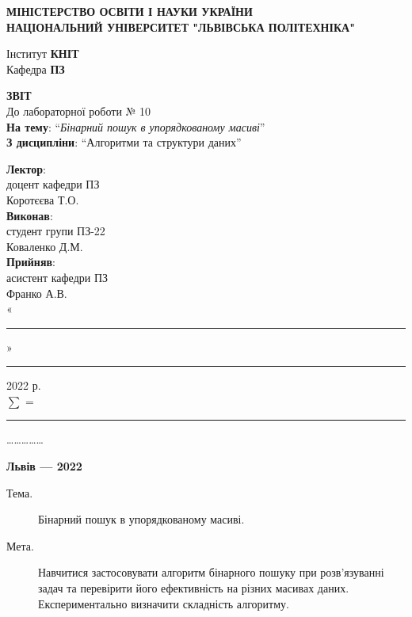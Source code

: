 \documentclass{article}
\newcommand\subject{Алгоритми та структури даних}
\newcommand\lecturer{доцент кафедри ПЗ\\Коротєєва Т.О.}
\newcommand\teacher{асистент кафедри ПЗ\\Франко А.В.}
\newcommand\mygroup{ПЗ-22}
\newcommand\lab{10}
\newcommand\theme{Бінарний пошук в упорядкованому масиві}
\newcommand\purpose{Навчитися застосовувати алгоритм бінарного пошуку при розв’язуванні задач та перевірити його ефективність на різних масивах даних. Експериментально визначити складність алгоритму}
\begin{document}
	\begin{normalsize}
		\begin{titlepage}
			\thispagestyle{empty}
			\begin{center}
				\textbf{МІНІСТЕРСТВО ОСВІТИ І НАУКИ УКРАЇНИ\\
					НАЦІОНАЛЬНИЙ УНІВЕРСИТЕТ "ЛЬВІВСЬКА ПОЛІТЕХНІКА"}
			\end{center}
			\begin{flushright}
				Інститут \textbf{КНІТ}\\
				Кафедра \textbf{ПЗ}
			\end{flushright}
			\vspace{200pt}
			\begin{center}
				\textbf{ЗВІТ}\\
				\vspace{10pt}
				До лабораторної роботи № \lab\\
				\textbf{На тему}: “\textit{\theme}”\\
				\textbf{З дисципліни}: “\subject”
			\end{center}
			\vspace{112pt}
			\begin{flushright}
				
				\textbf{Лектор}:\\
				\lecturer\\
				\vspace{28pt}
				\textbf{Виконав}:\\
				
				студент групи \mygroup\\
				Коваленко Д.М.\\
				\vspace{28pt}
				\textbf{Прийняв}:\\
				
				\teacher\\
				
				\vspace{28pt}
				«\rule{1cm}{0.15mm}» \rule{1.5cm}{0.15mm} 2022 р.\\
				$\sum$ = \rule{1cm}{0.15mm}……………\\
				
			\end{flushright}
			\vspace{\fill}
			\begin{center}
				\textbf{Львів — 2022}
			\end{center}
		\end{titlepage}
		
		\begin{description}
			\item[Тема.] \theme.
			\item[Мета.] \purpose.
		\end{description}
		

\end{normalsize}
\end{document}
